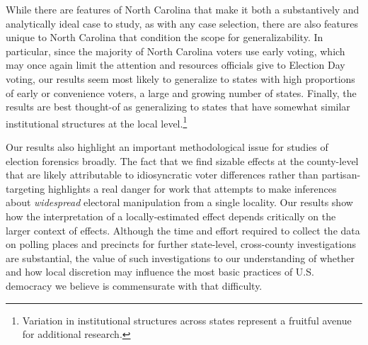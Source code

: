 \documentclass[12pt]{article}
\begin{document}
While there are features of North Carolina that make it both a substantively and analytically ideal case to study, as with any case selection, there are also features unique to North Carolina that condition the scope for generalizability.  In particular, since the majority of North Carolina voters use early voting, which may once again limit the attention and resources officials give to Election Day voting, our results seem most likely to generalize to states with high proportions of early or convenience voters, a large and growing number of states.  Finally, the results are best thought-of as generalizing to states that have somewhat similar institutional structures at the local level.\footnote{Variation in institutional structures across states represent a fruitful avenue for additional research.}


Our results also highlight an important methodological issue for studies of election forensics broadly.  The fact that we find sizable effects at the county-level that are likely attributable to idiosyncratic voter differences rather than partisan-targeting highlights a real danger for work that attempts to make inferences about \emph{widespread} electoral manipulation from a single locality.  Our results show how the interpretation of a locally-estimated effect depends critically on the larger context of effects.   Although the time and effort required to collect the data on polling places and precincts for further state-level, cross-county investigations are substantial, the value of such investigations to our understanding of whether and how local discretion may influence the most basic practices of U.S. democracy we believe is commensurate with that difficulty.

\end{document}
